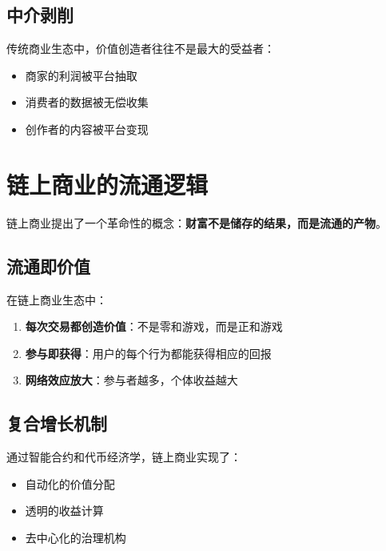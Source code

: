 \documentclass[
  Letterpaper,
]{scrbook}
\providecommand{\tightlist}{%
  \setlength{\itemsep}{0pt}\setlength{\parskip}{0pt}}
\begin{document}
\subsection{中介剥削}\label{ux4e2dux4ecbux5265ux524a}

传统商业生态中，价值创造者往往不是最大的受益者：

\begin{itemize}
\tightlist
\item
  商家的利润被平台抽取
\item
  消费者的数据被无偿收集
\item
  创作者的内容被平台变现
\end{itemize}

\section{链上商业的流通逻辑}\label{ux94feux4e0aux5546ux4e1aux7684ux6d41ux901aux903bux8f91}

链上商业提出了一个革命性的概念：\textbf{财富不是储存的结果，而是流通的产物}。

\subsection{流通即价值}\label{ux6d41ux901aux5373ux4ef7ux503c}

在链上商业生态中：

\begin{enumerate}
\def\labelenumi{\arabic{enumi}.}
\tightlist
\item
  \textbf{每次交易都创造价值}：不是零和游戏，而是正和游戏
\item
  \textbf{参与即获得}：用户的每个行为都能获得相应的回报
\item
  \textbf{网络效应放大}：参与者越多，个体收益越大
\end{enumerate}

\subsection{复合增长机制}\label{ux590dux5408ux589eux957fux673aux5236}

通过智能合约和代币经济学，链上商业实现了：

\begin{itemize}
\tightlist
\item
  自动化的价值分配
\item
  透明的收益计算
\item
  去中心化的治理机构
\end{itemize}
\end{document}

